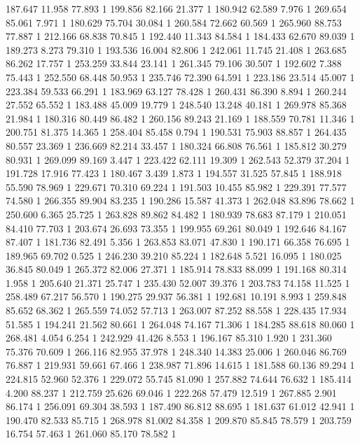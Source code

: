 	187.647	11.958	77.893	1
	199.856	82.166	21.377	1
	180.942	62.589	7.976	1
	269.654	85.061	7.971	1
	180.629	75.704	30.084	1
	260.584	72.662	60.569	1
	265.960	88.753	77.887	1
	212.166	68.838	70.845	1
	192.440	11.343	84.584	1
	184.433	62.670	89.039	1
	189.273	8.273	79.310	1
	193.536	16.004	82.806	1
	242.061	11.745	21.408	1
	263.685	86.262	17.757	1
	253.259	33.844	23.141	1
	261.345	79.106	30.507	1
	192.602	7.388	75.443	1
	252.550	68.448	50.953	1
	235.746	72.390	64.591	1
	223.186	23.514	45.007	1
	223.384	59.533	66.291	1
	183.969	63.127	78.428	1
	260.431	86.390	8.894	1
	260.244	27.552	65.552	1
	183.488	45.009	19.779	1
	248.540	13.248	40.181	1
	269.978	85.368	21.984	1
	180.316	80.449	86.482	1
	260.156	89.243	21.169	1
	188.559	70.781	11.346	1
	200.751	81.375	14.365	1
	258.404	85.458	0.794	1
	190.531	75.903	88.857	1
	264.435	80.557	23.369	1
	236.669	82.214	33.457	1
	180.324	66.808	76.561	1
	185.812	30.279	80.931	1
	269.099	89.169	3.447	1
	223.422	62.111	19.309	1
	262.543	52.379	37.204	1
	191.728	17.916	77.423	1
	180.467	3.439	1.873	1
	194.557	31.525	57.845	1
	188.918	55.590	78.969	1
	229.671	70.310	69.224	1
	191.503	10.455	85.982	1
	229.391	77.577	74.580	1
	266.355	89.904	83.235	1
	190.286	15.587	41.373	1
	262.048	83.896	78.662	1
	250.600	6.365	25.725	1
	263.828	89.862	84.482	1
	180.939	78.683	87.179	1
	210.051	84.410	77.703	1
	203.674	26.693	73.355	1
	199.955	69.261	80.049	1
	192.646	84.167	87.407	1
	181.736	82.491	5.356	1
	263.853	83.071	47.830	1
	190.171	66.358	76.695	1
	189.965	69.702	0.525	1
	246.230	39.210	85.224	1
	182.648	5.521	16.095	1
	180.025	36.845	80.049	1
	265.372	82.006	27.371	1
	185.914	78.833	88.099	1
	191.168	80.314	1.958	1
	205.640	21.371	25.747	1
	235.430	52.007	39.376	1
	203.783	74.158	11.525	1
	258.489	67.217	56.570	1
	190.275	29.937	56.381	1
	192.681	10.191	8.993	1
	259.848	85.652	68.362	1
	265.559	74.052	57.713	1
	263.007	87.252	88.558	1
	228.435	17.934	51.585	1
	194.241	21.562	80.661	1
	264.048	74.167	71.306	1
	184.285	88.618	80.060	1
	268.481	4.054	6.254	1
	242.929	41.426	8.553	1
	196.167	85.310	1.920	1
	231.360	75.376	70.609	1
	266.116	82.955	37.978	1
	248.340	14.383	25.006	1
	260.046	86.769	76.887	1
	219.931	59.661	67.466	1
	238.987	71.896	14.615	1
	181.588	60.136	89.294	1
	224.815	52.960	52.376	1
	229.072	55.745	81.090	1
	257.882	74.644	76.632	1
	185.414	4.200	88.237	1
	212.759	25.626	69.046	1
	222.268	57.479	12.519	1
	267.885	2.901	86.174	1
	256.091	69.304	38.593	1
	187.490	86.812	88.695	1
	181.637	61.012	42.941	1
	190.470	82.533	85.715	1
	268.978	81.002	84.358	1
	209.870	85.845	78.579	1
	203.759	16.754	57.463	1
	261.060	85.170	78.582	1
